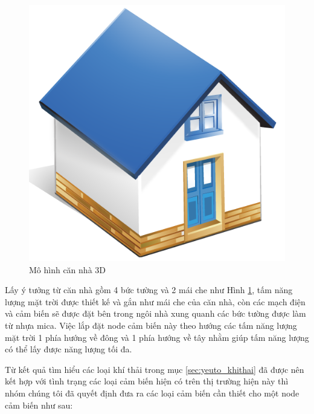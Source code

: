 \begin{figure}
    \includegraphics[scale=0.3]{house_home}
    \caption[Mô hình căn nhà 3D]{Mô hình căn nhà 3D}
    \label{fig:house_home}
\end{figure}
Lấy ý tưởng từ căn nhà gồm 4 bức tường và 2 mái che như Hình \ref{fig:house_home}, tấm năng lượng mặt trời được thiết kế và gắn như mái che của căn nhà, còn các mạch điện và cảm biến sẽ được đặt bên trong ngôi nhà xung quanh các bức tường được làm từ nhựa mica. Việc lắp đặt node cảm biến này theo hướng các tấm năng lượng mặt trời 1 phía hướng về đông và 1 phía hướng về tây nhằm giúp tấm năng lượng có thể lấy được năng lượng tối đa.

Từ kết quả tìm hiểu các loại khí thải trong mục \ref{sec:yeuto_khithai} đã được nên kết hợp với tình trạng các loại cảm biến hiện có trên thị trường hiện này thì nhóm chúng tôi đã quyết định đưa ra các loại cảm biến cần thiết cho một node cảm biến như sau:



